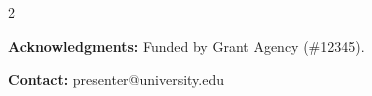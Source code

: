 \documentclass[a0paper,portrait,fontscale=0.285]{baposter}
\begin{document}
\begin{poster}
{\begin{multicols}{2}
    \columnbreak

    \textbf{Acknowledgments:} Funded by Grant Agency (\#12345).

    \vspace{0.3cm}
    \textbf{Contact:} presenter@university.edu
  \end{multicols}
}

\end{poster}
\end{document}
